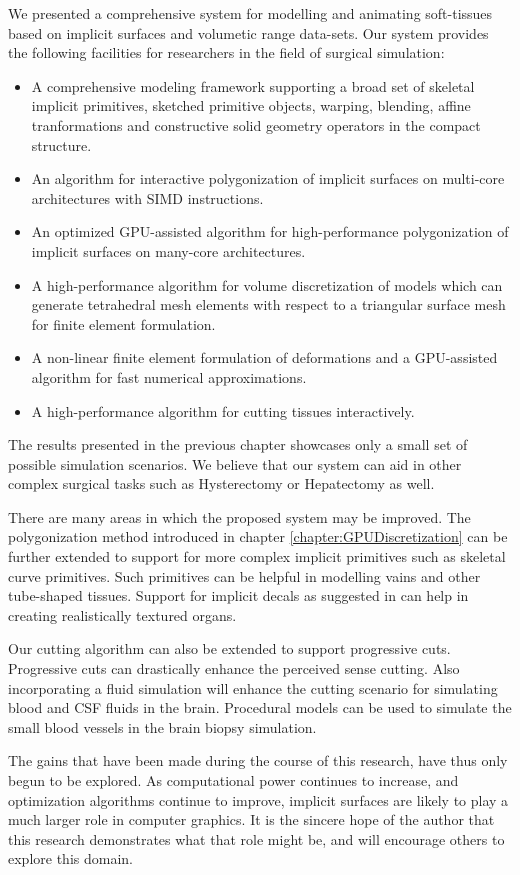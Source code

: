 \label{chapter:conclusion}
We presented a comprehensive system for modelling and animating soft-tissues based on implicit surfaces and volumetic range data-sets.
Our system provides the following facilities for researchers in the field of surgical simulation:

\begin{itemize}
 \item A comprehensive modeling framework supporting a broad set of skeletal implicit primitives, sketched primitive objects, warping, blending, 
 affine tranformations and constructive solid geometry operators in the compact \blob structure.
 \item An algorithm for interactive polygonization of implicit surfaces on multi-core architectures with SIMD instructions.
 \item An optimized GPU-assisted algorithm for high-performance polygonization of implicit surfaces on many-core architectures.
 \item A high-performance algorithm for volume discretization of \blob models which can generate tetrahedral mesh elements with respect to a triangular 
 surface mesh for finite element formulation.
 \item A non-linear finite element formulation of deformations and a GPU-assisted algorithm for fast numerical approximations.
 \item A high-performance algorithm for cutting tissues interactively. 
\end{itemize}

The results presented in the previous chapter showcases only a small set of possible simulation scenarios. We believe that our 
system can aid in other complex surgical tasks such as Hysterectomy or Hepatectomy as well. 

There are many areas in which the proposed system may be improved. The polygonization method introduced in chapter \ref{chapter:GPUDiscretization} can be further 
extended to support for more complex implicit primitives such as skeletal curve primitives. Such primitives can be helpful in modelling vains and other tube-shaped
tissues. Support for implicit decals as suggested in \cite{Schmidtb} can help in creating realistically textured organs. 

Our cutting algorithm can also be extended to support progressive cuts. Progressive cuts can drastically enhance the perceived sense cutting. 
Also incorporating a fluid simulation will enhance the cutting scenario for simulating blood and CSF fluids in the brain.
Procedural models can be used to simulate the small blood vessels in the brain biopsy simulation. 

The gains that have been made during the course of this research, have thus only begun to be explored. As computational
power continues to increase, and optimization algorithms continue to improve, implicit surfaces are likely to play a much larger role in 
computer graphics. It is the sincere hope of the author that this research demonstrates what that role might be, and will encourage others
to explore this domain.
